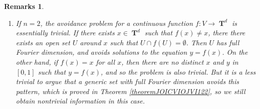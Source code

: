 \documentclass[dvipsnames,letterpaper,12pt]{article}
\numberwithin{equation}{section}
\DeclareMathOperator{\fordim}{\dim_{\mathbf{F}}}
\DeclareMathOperator{\RR}{\mathbf{R}}
\DeclareMathOperator{\TT}{\mathbf{T}}
\newtheorem{remarks}[theorem]{Remarks}
\numberwithin{theorem}{section}
\begin{document}
\begin{remarks}
\begin{enumerate}




        \item If $n = 2$, the avoidance problem for a continuous function $f: V \to \TT^d$ is essentially trivial. If there exists $x \in \TT^d$ such that $f(x) \neq x$, there there exists an open set $U$ around $x$ such that $U \cap f(U) = \emptyset$. Then $U$ has full Fourier dimension, and avoids solutions to the equation $y = f(x)$. On the other hand, if $f(x) = x$ for all $x$, then there are no distinct $x$ and $y$ in $[0,1]$ such that $y = f(x)$, and so the problem is also trivial. But it is a less trivial to argue that a \emph{generic} set with full Fourier dimension avoids this pattern, which is proved in Theorem \ref{theoremJOICVIOJVI122}, so we still obtain nontrivial information in this case.
    \end{enumerate}
\end{remarks}

\end{document}
